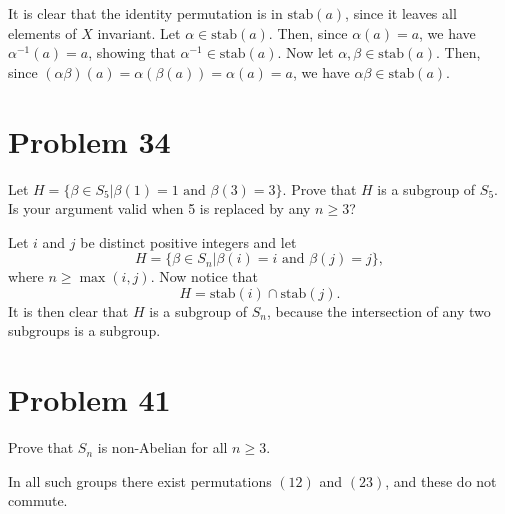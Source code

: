 \documentclass[12pt]{article}
\newcommand{\stab}{\mbox{stab}}
\begin{document}
It is clear that the identity permutation is in $\stab(a)$, since it leaves all elements
of $X$ invariant.  Let $\alpha\in\stab(a)$.  Then, since $\alpha(a)=a$, we have
$\alpha^{-1}(a)=a$, showing that $\alpha^{-1}\in\stab(a)$.  Now let $\alpha,\beta\in\stab(a)$.
Then, since $(\alpha\beta)(a)=\alpha(\beta(a))=\alpha(a)=a$, we have
$\alpha\beta\in\stab(a)$.

\section*{Problem 34}

Let $H=\{\beta\in S_5|\mbox{$\beta(1)=1$ and $\beta(3)=3$}\}$.  Prove that $H$ is a subgroup of
$S_5$.  Is your argument valid when 5 is replaced by any $n\geq 3$?

Let $i$ and $j$ be distinct positive integers and let
\begin{equation*}
H=\{\beta\in S_n|\mbox{$\beta(i)=i$ and $\beta(j)=j$}\},
\end{equation*}
where $n\geq\max(i,j)$.  Now notice that
\begin{equation*}
H = \stab(i)\cap\stab(j).
\end{equation*}
It is then clear that $H$ is a subgroup of $S_n$, because the intersection
of any two subgroups is a subgroup.

\section*{Problem 41}

Prove that $S_n$ is non-Abelian for all $n\geq 3$.

In all such groups there exist permutations $(12)$ and $(23)$,
and these do not commute.
\end{document}
